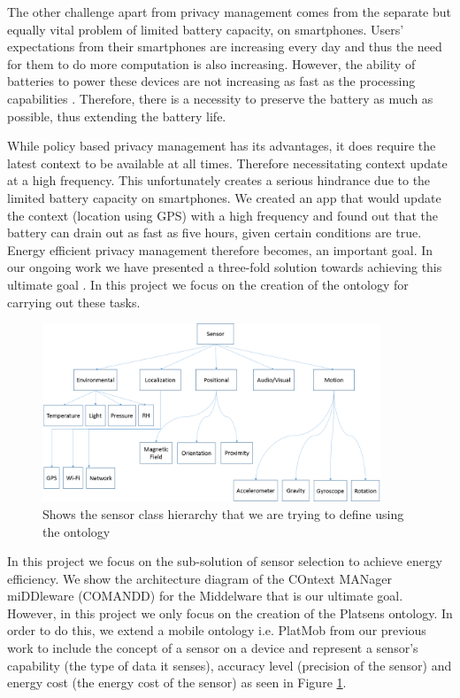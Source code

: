 \documentclass{ubicomp2013}
\begin{document}
The other challenge apart from privacy management comes from the separate but equally vital problem of limited battery capacity, on smartphones. Users' expectations from their smartphones are increasing every day and thus the need for them to do more computation is also increasing. However, the ability of batteries to power these devices are not increasing as fast as the processing capabilities \cite{boxall2012battery}. Therefore, there is a necessity to preserve the battery as much as possible, thus extending the battery life.

While policy based privacy management has its advantages, it does require the latest context to be available at all times. Therefore necessitating context update at a high frequency. This unfortunately creates a serious hindrance due to the limited battery capacity on smartphones. We created an app that would update the context (location using GPS) with a high frequency and found out that the battery can drain out as fast as five hours, given certain conditions are true. Energy efficient privacy management therefore becomes, an important goal. In our ongoing work we have presented a three-fold solution towards achieving this ultimate goal \cite{das2012energy}. In this project we focus on the creation of the ontology for carrying out these tasks.

\begin{figure}[tbh]
\centering
\includegraphics[width=0.9\textwidth]{Sensor_Class_Hierarchy.png}
\caption{Shows the sensor class hierarchy that we are trying to define using the ontology}
\label{fig:hierarchy}
\end{figure}

In this project we focus on the sub-solution of sensor selection to achieve energy efficiency. We show the architecture diagram of the COntext MANager miDDleware (COMANDD) for the Middelware that is our ultimate goal. However, in this project we only focus on the creation of the Platsens ontology. In order to do this, we extend a mobile ontology i.e. PlatMob \cite{ghosh2012privacy,ghosh2012ms} from our previous work to include the concept of a sensor on a device and represent a sensor's capability (the type of data it senses), accuracy level (precision of the sensor) and energy cost (the energy cost of the sensor) as seen in Figure \ref{fig:hierarchy}.
  
\end{document}
